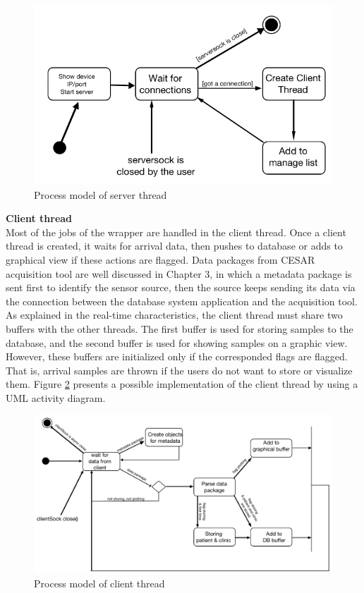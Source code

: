 \begin{figure}[ht]
    \centering
    \includegraphics[width=1.0\textwidth]{Figures/ServerActivity.png}
    \caption{Process model of server thread}
    \label{fig:Figures/ServerActivity}
\end{figure}
\textbf{Client thread}\\
Most of the jobs of the wrapper are handled in the client thread. Once a client thread is created, it waits for arrival data, then pushes to database or adds to graphical view if these actions are flagged. Data packages from CESAR acquisition tool are well discussed in Chapter 3, in which a metadata package is sent first to identify the sensor source, then the source keeps sending its data via the connection between the database system application and the acquisition tool. As explained in the real-time characteristics, the client thread must share two buffers with the other threads. The first buffer is used for storing samples to the database, and the second buffer is used for showing samples on a graphic view. However, these buffers are initialized only if the corresponded flags are flagged. That is, arrival samples are thrown if the users do not want to store or visualize them. Figure \ref{fig:Figures/ClientThreadAc} presents a possible implementation of the client thread by using a UML activity diagram.
\begin{figure}[ht]
    \centering
    \includegraphics[width=1.0\textwidth]{Figures/ClientThreadAc.png}
    \caption{Process model of client thread}
    \label{fig:Figures/ClientThreadAc}
\end{figure}
